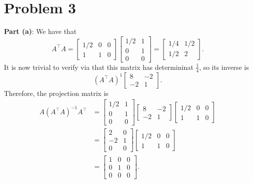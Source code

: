 \documentclass[11pt]{article}
\begin{document}

\section{Problem 3}

\textbf{Part (a)}: We have that
\[
	A^{\top} A = \begin{bmatrix} 1/2 & 0 & 0 \\ 1 & 1 & 0 \end{bmatrix} \begin{bmatrix} 1/2 & 1 \\ 0 & 1 \\ 0 & 0 \end{bmatrix} = \begin{bmatrix} 1/4 & 1/2 \\ 1/2 & 2 \end{bmatrix}. 
\]
It is now trivial to verify via that this matrix has determininat $\tfrac{1}{4}$, so its inverse is
\[
	(A^{\top}A)^{1} \begin{bmatrix} 8 & -2 \\ -2 & 1 \end{bmatrix}.
\]
Therefore, the projection matrix is
\begin{align*}
	A(A^{\top}A)^{-1}A^{\top} &= \begin{bmatrix} 1/2 & 1 \\ 0 & 1 \\ 0 & 0 \end{bmatrix} \begin{bmatrix} 8 & -2 \\ -2 & 1 \end{bmatrix} \begin{bmatrix} 1/2 & 0 & 0 \\ 1 & 1 & 0 \end{bmatrix} \\
							  &= \begin{bmatrix} 2 & 0 \\ -2 & 1 \\ 0 & 0 \end{bmatrix} \begin{bmatrix} 1/2 & 0 & 0 \\ 1 & 1 & 0 \end{bmatrix} \\
							  &= \boxed{ \begin{bmatrix} 1 & 0 & 0 \\ 0 & 1 & 0 \\ 0 & 0 & 0 \end{bmatrix}.}
\end{align*}
\end{document}
